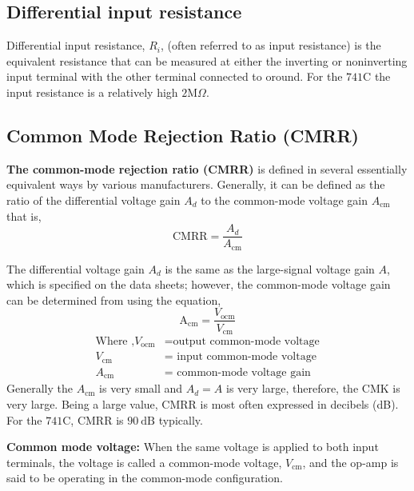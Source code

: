    \subsection{Differential input resistance}
   Differential input resistance, $R_{i}$, (often referred to as input resistance) is the equivalent resistance that can be measured at either the inverting or noninverting input terminal with the other terminal connected to oround. For the $741 \mathrm{C}$ the input resistance is a relatively high $2 \mathrm{M} \Omega$.
   \subsection{Common Mode Rejection Ratio (CMRR)}
  \textbf{The common-mode rejection ratio (CMRR) }is defined in several essentially equivalent ways by various manufacturers. Generally, it can be defined as the ratio of the differential voltage gain $A_{d}$ to the common-mode voltage gain $A_{\mathrm{cm}} $ that is,
   \begin{equation}
   \mathrm{CMRR}=\frac{A_{d}}{A_{\mathrm{cm}}}
   \end{equation}
  
   The differential voltage gain $A_{d}$ is the same as the large-signal voltage gain $A$, which is specified on the data sheets; however, the common-mode voltage gain can be determined from  using the equation,
   \begin{equation}
  \mathrm{A}_{\mathrm{cm}}=\frac{V_\mathrm{ocm}}{V_{\mathrm{cm}}}
   \end{equation}
   $$
   \begin{aligned}
   \text{Where ,} V_\mathrm{ocm}&= \text{output common-mode voltage}\\
   V_{\mathrm{cm}}&=\text { input common-mode voltage } \\
   A_{\mathrm{cm}}&=\text { common-mode voltage gain }
   \end{aligned}
   $$
   Generally the $A_{\mathrm{cm}}$ is very small and $A_{d}=A$ is very large, therefore, the $\mathrm{CMK}$ is very large. Being a large value, CMRR is most often expressed in decibels (dB). For the $741 \mathrm{C}$, CMRR is $90 \mathrm{~dB}$ typically.
   \begin{note}
   	  \textbf{Common mode voltage:} When the same voltage is applied to both input terminals, the voltage is called a common-mode voltage, $V_{\mathrm{cm}}$, and the op-amp is said to be operating in the common-mode configuration.
   \end{note}
